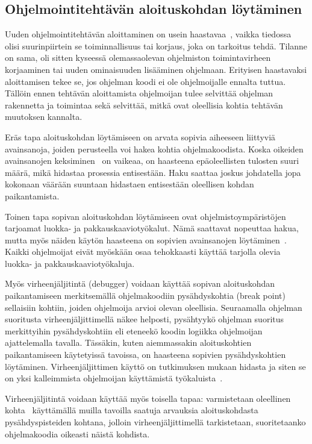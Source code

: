 \documentclass[finnish]{tktltiki2}
\theoremstyle{definition}
\theoremstyle{remark}
\begin{document}
\subsection{Ohjelmointitehtävän aloituskohdan löytäminen}

Uuden ohjelmointitehtävän aloittaminen on usein haastavaa~\cite{questions-during-software-evolution-tasks}, vaikka tiedossa olisi suurinpiirtein se toiminnallisuus tai korjaus, joka on tarkoitus tehdä. Tilanne on sama, oli sitten kyseessä olemassaolevan ohjelmiston toimintavirheen korjaaminen tai uuden ominaisuuden lisääminen ohjelmaan. Erityisen haastavaksi aloittamisen tekee se, jos ohjelman koodi ei ole ohjelmoijalle ennalta tuttua. Tällöin ennen tehtävän aloittamista ohjelmoijan tulee selvittää ohjelman rakennetta ja toimintaa sekä selvittää, mitkä ovat oleellisia kohtia tehtävän muutoksen kannalta.

Eräs tapa aloituskohdan löytämiseen on arvata sopivia aiheeseen liittyviä avainsanoja, joiden perusteella voi hakea kohtia ohjelmakoodista. Koska oikeiden avainsanojen keksiminen~\cite{what-to-search-for} on vaikeaa, on haasteena epäoleellisten tulosten suuri määrä, mikä hidastaa prosessia entisestään. Haku saattaa joskus johdatella jopa kokonaan väärään suuntaan hidastaen entisestään oleellisen kohdan paikantamista.

Toinen tapa sopivan aloituskohdan löytämiseen ovat ohjelmistoympäristöjen tarjoamat luokka- ja pakkauskaaviotyökalut. Nämä saattavat nopeuttaa hakua, mutta myös näiden käytön haasteena on sopivien avainsanojen löytäminen~\cite{what-to-search-for}. Kaikki ohjelmoijat eivät myöskään osaa tehokkaasti käyttää tarjolla olevia luokka- ja pakkauskaaviotyökaluja.

Myös virheenjäljitintä (debugger) voidaan käyttää sopivan aloituskohdan paikantamiseen merkitsemällä ohjelmakoodiin pysähdyskohtia (break point) sellaisiin kohtiin, joiden ohjelmoija arvioi olevan oleellisia.
Seuraamalla ohjelman suoritusta virheenjäljittimellä näkee helposti, pysähtyykö ohjelman suoritus merkittyihin pysähdyskohtiin eli eteneekö koodin logiikka ohjelmoijan ajattelemalla tavalla.
Tässäkin, kuten aiemmassakin aloituskohtien paikantamiseen käytetyissä tavoissa, on haasteena sopivien pysähdyskohtien löytäminen. Virheenjäljittimen käyttö on tutkimuksen mukaan hidasta ja siten se on yksi kalleimmista ohjelmoijan käyttämistä työkaluista~\cite{debugging-is-expensive}.

Virheenjäljitintä voidaan käyttää myös toisella tapaa: varmistetaan oleellinen kohta~\cite{eliciting-design-requirements-for-maintenance-oriented-ides} käyttämällä muilla tavoilla saatuja arvauksia aloituskohdasta pysähdyspisteiden kohtana, jolloin virheenjäljittimellä tarkistetaan, suoritetaanko ohjelmakoodia oikeasti näistä kohdista.
\end{document}
